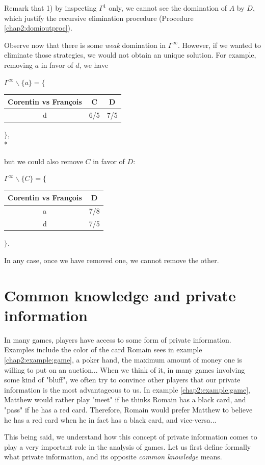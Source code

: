 \begin{example}
Remark that 1) by inspecting $\Gamma^1$ only, we cannot see the domination of $A$ by $D$, which justify the recursive elimination procedure (Procedure \ref{chap2:domioutproc}).

Observe now that there is some \emph{weak} domination in $\Gamma^\infty$. However, if we wanted to eliminate those strategies, we would not obtain an unique solution.
For example, removing $a$ in favor of $d$, we have
\begin{center}
$\Gamma^{\infty}\backslash \{ a \}= \Bigg \{$
\begin{tabular}{c|cc}
  Corentin vs Fran\c{c}ois   & C & D\\ 
\hline d   & 6/5 & 7/5 \\
\end{tabular} 
$\Bigg \},$\\*
\end{center}
but we could also remove $C$ in favor of $D$:
\begin{center}
$\Gamma^{\infty}  \backslash \{C\} = \Bigg \{$
\begin{tabular}{c|c}
  Corentin vs Fran\c{c}ois   & D\\ 
\hline a   & 7/8 \\
 d   & 7/5 \\
\end{tabular} 
$\Bigg \}.$
\end{center}
In any case, once we have removed one, we cannot remove the other. 
\end{example}

\section{Common knowledge and private information}
 
 
In many games, players have access to some form of private information.
Examples include the color of the card Romain sees in example \ref{chap2:example:game}, a poker hand, the maximum amount of money one is willing to put on an auction... When we think of it, in many games involving some kind of "bluff", we often try to convince other players that our private information is the most advantageous to us.
In example \ref{chap2:example:game}, Matthew would rather play "meet" if he thinks Romain has a black card, and "pass" if he has a red card. Therefore, Romain would prefer Matthew to believe he has a red card when he in fact has a black card, and vice-versa...

This being said, we understand how this concept of private information comes to play a very important role in the analysis of games. Let us first define formally 
what private information, and its opposite \emph{common knowledge} means.

